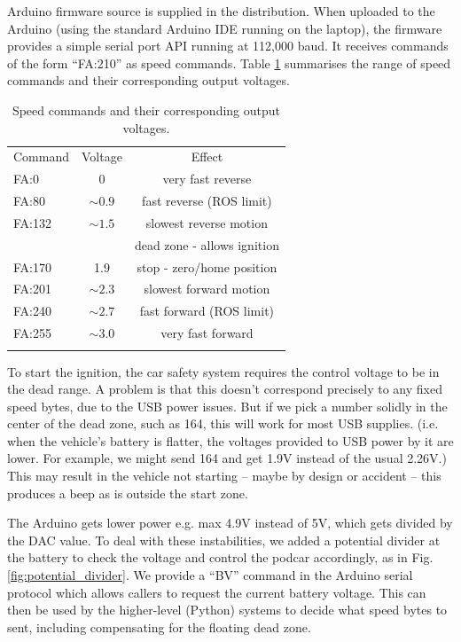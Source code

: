 \documentclass[a4paper]{article}
\begin{document}
	Arduino firmware source is supplied in the distribution. When uploaded to the Arduino (using the standard Arduino IDE running on the laptop), the firmware provides a simple serial port API running at 112,000 baud. It receives commands of the form ``FA:210'' as speed commands. Table \ref{tab:speed_commands} summarises the range of speed commands and their corresponding output voltages. 
	
	\begin{table}
		\begin{center}
			\caption{Speed commands and their corresponding output voltages.}
			\label{tab:speed_commands}
			\begin{tabular}{ l c c }
				\hline
				Command   &    Voltage            &  Effect \\
				FA:0      &    0                  & very fast reverse  \\
				FA:80     &    $\sim 0.9$         & fast reverse (ROS limit) \\
				FA:132    &   $\sim 1.5$          & slowest reverse motion  \\
				&                       & dead zone - allows ignition \\
				FA:170    &    1.9                & stop - zero/home position \\
				FA:201    &    $\sim 2.3$         & slowest forward motion \\
				FA:240    &    $\sim 2.7$         & fast forward (ROS limit) \\
				FA:255    &    $\sim 3.0$         & very fast forward \\
				\hline\\
			\end{tabular}
		\end{center}    
	\end{table}
	
	To start the ignition, the car safety system requires the control voltage to be in the dead range. A problem is that this doesn’t correspond precisely to any fixed speed bytes, due to the USB power issues.  But if we pick a number solidly in the center of the dead zone, such as 164, this will work for most USB supplies. (i.e. when the vehicle’s battery is flatter, the voltages provided to USB power by it are lower. For example, we might send 164 and get 1.9V instead of the usual 2.26V.) This may result in the vehicle not starting -- maybe by design or accident -- this produces a beep as is outside the start zone. 
	
	The Arduino gets lower power e.g. max 4.9V instead of 5V, which gets divided by the DAC value. To deal with these instabilities, we added a potential divider at the battery to check the voltage and control the podcar accordingly, as in Fig. \ref{fig:potential_divider}. We provide a ``BV'' command in the Arduino serial protocol which allows callers to request the current battery voltage. This can then be used by the higher-level (Python) systems to decide what speed bytes to sent, including compensating for the floating dead zone.
	
\end{document}
